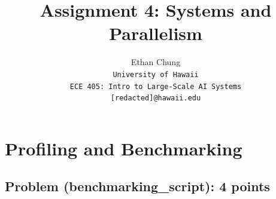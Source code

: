 \documentclass[letterpaper]{article}
\begin{document}
	\title{Assignment 4: Systems and Parallelism}
	
	\author{Ethan Chung\\
		{\tt\small University of Hawaii}\\
		{\tt\small ECE 405: Intro to Large-Scale AI Systems}\\
		{\tt\small [redacted]@hawaii.edu}}
	
	\maketitle
	
	\tableofcontents
	
	\newpage
	
	\section{Profiling and Benchmarking}
	
	\subsection{Problem (benchmarking\_script): 4 points}
	
\end{document}
